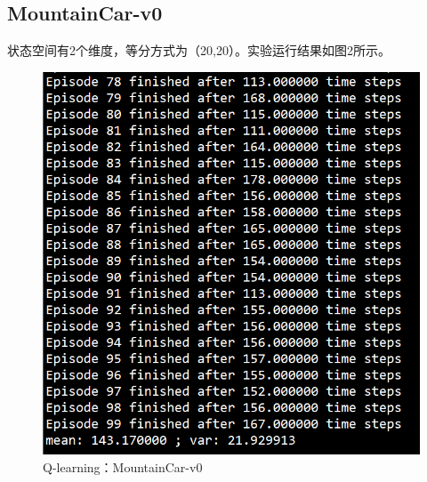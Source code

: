 \documentclass[a4paper,UTF8]{article}
\theoremstyle{definition}
\begin{document}
\subsection{MountainCar-v0}
    状态空间有2个维度，等分方式为（20,20）。实验运行结果如图2所示。
    \begin{center}
    \begin{figure}[H]
          \centering
          \includegraphics[width=12cm]{2.png}
          \caption{Q-learning：MountainCar-v0}
          \label{fig:2.3}
    \end{figure}
    \end{center}
\end{document}
